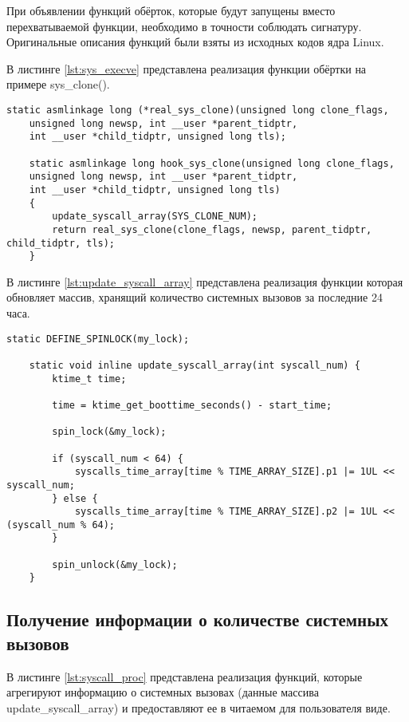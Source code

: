 При объявлении функций обёрток, которые будут запущены вместо перехватываемой функции, необходимо в точности соблюдать сигнатуру. Оригинальные описания функций были взяты из исходных кодов ядра Linux. 

В листинге \ref{lst:sys_execve} представлена реализация функции обёртки на примере sys\_clone().

\begin{lstlisting}[label=lst:sys_execve, caption=Реализация функции обёртки]
	static asmlinkage long (*real_sys_clone)(unsigned long clone_flags,
	unsigned long newsp, int __user *parent_tidptr,
	int __user *child_tidptr, unsigned long tls);
	
	static asmlinkage long hook_sys_clone(unsigned long clone_flags,
	unsigned long newsp, int __user *parent_tidptr,
	int __user *child_tidptr, unsigned long tls)
	{
		update_syscall_array(SYS_CLONE_NUM);
		return real_sys_clone(clone_flags, newsp, parent_tidptr, child_tidptr, tls);
	}
\end{lstlisting}

В листинге \ref{lst:update_syscall_array} представлена реализация функции которая обновляет массив, хранящий количество системных вызовов за последние 24 часа.

\begin{lstlisting}[label=lst:update_syscall_array, caption=Реализация функции update\_syscall\_array()]
	static DEFINE_SPINLOCK(my_lock);
	
	static void inline update_syscall_array(int syscall_num) {
		ktime_t time;
		
		time = ktime_get_boottime_seconds() - start_time;
		
		spin_lock(&my_lock);
		
		if (syscall_num < 64) {
			syscalls_time_array[time % TIME_ARRAY_SIZE].p1 |= 1UL << syscall_num;
		} else {
			syscalls_time_array[time % TIME_ARRAY_SIZE].p2 |= 1UL << (syscall_num % 64);
		}
		
		spin_unlock(&my_lock);
	}
\end{lstlisting}

\subsection{Получение информации о количестве системных вызовов}

В листинге \ref{lst:syscall_proc} представлена реализация функций, которые агрегируют информацию о системных вызовах (данные массива update\_syscall\_array) и предоставляют ее в читаемом для пользователя виде.


